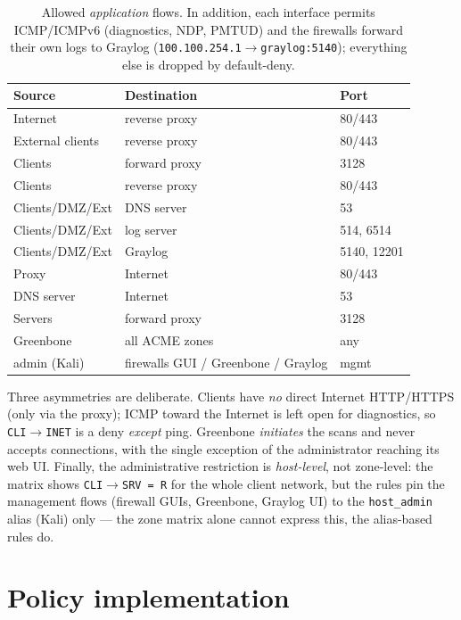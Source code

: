 \documentclass[twocolumn]{NobArticle}
\begin{document}
\begin{table}[H]
\centering
\setlength{\tabcolsep}{3pt}
\begin{tabular}{lll}
\toprule
\textbf{Source} & \textbf{Destination} & \textbf{Port} \\
\midrule
Internet        & reverse proxy   & 80/443 \\
External clients& reverse proxy   & 80/443 \\
Clients         & forward proxy   & 3128 \\
Clients         & reverse proxy   & 80/443 \\
Clients/DMZ/Ext & DNS server      & 53 \\
Clients/DMZ/Ext & log server      & 514, 6514 \\
Clients/DMZ/Ext & Graylog         & 5140, 12201 \\
Proxy           & Internet        & 80/443 \\
DNS server      & Internet        & 53 \\
Servers         & forward proxy   & 3128 \\
Greenbone       & all ACME zones  & any \\
admin (Kali)    & firewalls GUI / Greenbone / Graylog & mgmt \\
\bottomrule
\end{tabular}
\caption{Allowed \textit{application} flows. In addition, each interface permits
ICMP/ICMPv6 (diagnostics, NDP, PMTUD) and the firewalls forward their own logs
to Graylog (\texttt{100.100.254.1$\to$graylog:5140}); everything else is dropped
by default-deny.}
\label{tab:flows}
\end{table}

Three asymmetries are deliberate. Clients have \textit{no} direct Internet
HTTP/HTTPS (only via the proxy); ICMP toward the Internet is left open for
diagnostics, so \texttt{CLI$\to$INET} is a deny \textit{except} ping. Greenbone
\textit{initiates} the scans and never accepts connections, with the single
exception of the administrator reaching its web UI. Finally, the administrative
restriction is \textit{host-level}, not zone-level: the matrix shows
\texttt{CLI$\to$SRV = R} for the whole client network, but the rules pin the
management flows (firewall GUIs, Greenbone, Graylog UI) to the
\texttt{host\_admin} alias (Kali) only --- the zone matrix alone cannot express
this, the alias-based rules do.

\section{Policy implementation}
\end{document}
